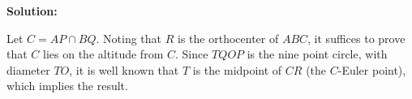 
\begin{solution}
\textbf{Solution}\textbf{:}\V

Let $C = AP\cap BQ$. Noting that $R$ is the orthocenter of $ABC$, it suffices to prove that $C$ lies on the altitude from $C$. Since $TQOP$ is the nine point circle, with diameter $TO$, it is well known that $T$ is the midpoint of $CR$ (the $C$-Euler point), which implies the result.
\end{solution}\V